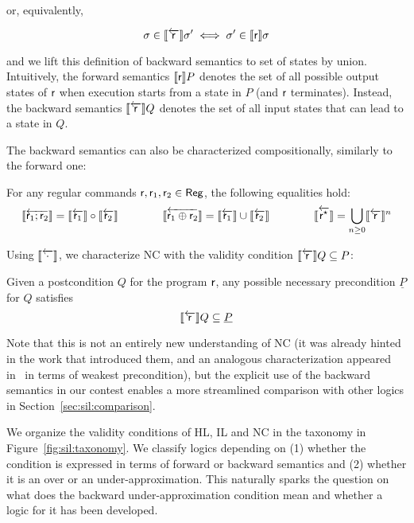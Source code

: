 \noindent or, equivalently,

\begin{equation}
	\sigma \in \llbracket\overleftarrow{\mathsf{r}}\rrbracket \sigma' \iff \sigma' \in \llbracket\mathsf{r}\rrbracket \sigma  \label{eq:sil:bwsem-sigma-sigma'}
\end{equation}

\noindent and we lift this definition of backward semantics to set of states by union.
Intuitively, the forward semantics $\llbracket\mathsf{r}\rrbracket P$ denotes the set of all possible output states of $\mathsf{r}$ when execution starts from a state in $P$ (and $\mathsf{r}$ terminates).
Instead, the backward semantics $\llbracket\overleftarrow{\mathsf{r}}\rrbracket Q$ denotes the set of all input states that can lead to a state in $Q$.

The backward semantics can also be characterized compositionally, similarly to the forward one:

\begin{lemma}\label{lmm:sil:bwsem-calculus}
	For any regular commands $\mathsf{r},\mathsf{r}_1,\mathsf{r}_2\in \mathsf{Reg}$, the following equalities hold:
	\[
	\llbracket\overleftarrow{\mathsf{r}_1; \mathsf{r}_2}\rrbracket = \llbracket\overleftarrow{\mathsf{r}_1}\rrbracket \circ \llbracket\overleftarrow{\mathsf{r}_2}\rrbracket \qquad\qquad
	\llbracket\overleftarrow{\mathsf{r}_1 \oplus \mathsf{r}_2}\rrbracket = \llbracket\overleftarrow{\mathsf{r}_1}\rrbracket \cup \llbracket\overleftarrow{\mathsf{r}_2}\rrbracket \qquad\qquad
	\llbracket\overleftarrow{{\mathsf{r}^\star}}\rrbracket = \bigcup\limits_{n \ge 0} \llbracket\overleftarrow{\mathsf{r}}\rrbracket^n
	\]
\end{lemma}

Using $\llbracket\overleftarrow{\cdot}\rrbracket$, we characterize NC with the validity condition $\llbracket\overleftarrow{\mathsf{r}}\rrbracket Q \subseteq P$:

\begin{prop}\label{prop:sil:nc}
	Given a postcondition $Q$ for the program $\mathsf{r}$, any possible necessary precondition $\underline{P}$ for $Q$ satisfies
	\[
	\llbracket\overleftarrow{\mathsf{r}}\rrbracket Q \subseteq \underline{P}
	\]
\end{prop}

Note that this is not an entirely new understanding of NC (it was already hinted in the work that introduced them, and an analogous characterization appeared in~\cite[§6.3]{ZK22} in terms of weakest precondition), but the explicit use of the backward semantics in our contest enables a more streamlined comparison with other logics in Section~\ref{sec:sil:comparison}.

We organize the validity conditions of HL, IL and NC in the taxonomy in Figure~\ref{fig:sil:taxonomy}. We classify logics depending on (1) whether the condition is expressed in terms of forward or backward semantics and (2) whether it is an over or an under-approximation.
This naturally sparks the question on what does the backward under-approximation condition mean and whether a logic for it has been developed.


